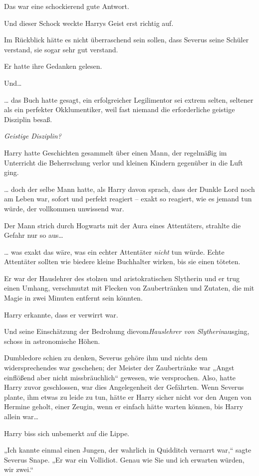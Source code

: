 {Das war eine schockierend gute Antwort.

Und dieser Schock weckte Harrys Geist erst richtig auf.

Im Rückblick hätte es nicht überraschend sein sollen, dass Severus seine Schüler verstand, sie sogar sehr gut verstand.

Er hatte ihre Gedanken gelesen.

Und…

… das Buch hatte gesagt, ein erfolgreicher Legilimentor sei extrem selten, seltener als ein perfekter Okklumentiker, weil fast niemand die erforderliche geistige Disziplin besaß.

\emph{Geistige Disziplin?}

Harry hatte Geschichten gesammelt über einen Mann, der regelmäßig im Unterricht die Beherrschung verlor und kleinen Kindern gegenüber in die Luft ging.

… doch der selbe Mann hatte, als Harry davon sprach, dass der Dunkle Lord noch am Leben war, sofort und perfekt reagiert -- exakt so reagiert, wie es jemand tun würde, der vollkommen unwissend war.

Der Mann strich durch Hogwarts mit der Aura eines Attentäters, strahlte die Gefahr nur so aus…

… was exakt das wäre, was ein echter Attentäter \emph{nicht} tun würde. Echte Attentäter sollten wie biedere kleine Buchhalter wirken, bis sie einen töteten.

Er war der Hauslehrer des stolzen und aristokratischen Slytherin und er trug einen Umhang, verschmutzt mit Flecken von Zaubertränken und Zutaten, die mit Magie in zwei Minuten entfernt sein könnten.

Harry erkannte, dass er verwirrt war.

Und seine Einschätzung der Bedrohung dievom\emph{Hauslehrer von Slytherin}ausging, schoss in astronomische Höhen.

Dumbledore schien zu denken, Severus gehöre ihm und nichts dem widersprechendes war geschehen; der Meister der Zaubertränke war „Angst einflößend aber nicht missbräuchlich“ gewesen, wie versprochen. Also, hatte Harry zuvor geschlossen, war dies Angelegenheit der Gefährten. Wenn Severus plante, ihm etwas zu leide zu tun, hätte er Harry sicher nicht vor den Augen von Hermine geholt, einer Zeugin, wenn er einfach hätte warten können, bis Harry allein war…

Harry biss sich unbemerkt auf die Lippe.

„Ich kannte einmal einen Jungen, der wahrlich in Quidditch vernarrt war,“ sagte Severus Snape. „Er war ein Vollidiot. Genau wie Sie und ich erwarten würden, wir zwei.“

}

